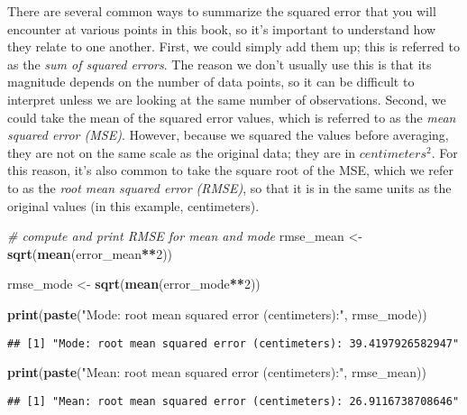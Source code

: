 \documentclass[]{book}
\newenvironment{Shaded}{\begin{snugshade}}{\end{snugshade}}
\newcommand{\KeywordTok}[1]{\textcolor[rgb]{0.13,0.29,0.53}{\textbf{#1}}}
\newcommand{\DecValTok}[1]{\textcolor[rgb]{0.00,0.00,0.81}{#1}}
\newcommand{\StringTok}[1]{\textcolor[rgb]{0.31,0.60,0.02}{#1}}
\newcommand{\CommentTok}[1]{\textcolor[rgb]{0.56,0.35,0.01}{\textit{#1}}}
\newcommand{\OperatorTok}[1]{\textcolor[rgb]{0.81,0.36,0.00}{\textbf{#1}}}
\newcommand{\NormalTok}[1]{#1}
\theoremstyle{definition}
\theoremstyle{definition}
\theoremstyle{definition}
\theoremstyle{remark}
\begin{document}
There are several common ways to summarize the squared error that you
will encounter at various points in this book, so it's important to
understand how they relate to one another. First, we could simply add
them up; this is referred to as the \emph{sum of squared errors}. The
reason we don't usually use this is that its magnitude depends on the
number of data points, so it can be difficult to interpret unless we are
looking at the same number of observations. Second, we could take the
mean of the squared error values, which is referred to as the \emph{mean
squared error (MSE)}. However, because we squared the values before
averaging, they are not on the same scale as the original data; they are
in \(centimeters^2\). For this reason, it's also common to take the
square root of the MSE, which we refer to as the \emph{root mean squared
error (RMSE)}, so that it is in the same units as the original values
(in this example, centimeters).

\begin{Shaded}
\begin{Highlighting}[]
\CommentTok{# compute and print RMSE for mean and mode}
\NormalTok{rmse_mean <-}\StringTok{ }\KeywordTok{sqrt}\NormalTok{(}\KeywordTok{mean}\NormalTok{(error_mean}\OperatorTok{**}\DecValTok{2}\NormalTok{))}

\NormalTok{rmse_mode <-}\StringTok{ }\KeywordTok{sqrt}\NormalTok{(}\KeywordTok{mean}\NormalTok{(error_mode}\OperatorTok{**}\DecValTok{2}\NormalTok{))}

\KeywordTok{print}\NormalTok{(}\KeywordTok{paste}\NormalTok{(}\StringTok{"Mode: root mean squared error (centimeters):"}\NormalTok{, rmse_mode))}
\end{Highlighting}
\end{Shaded}

\begin{verbatim}
## [1] "Mode: root mean squared error (centimeters): 39.4197926582947"
\end{verbatim}

\begin{Shaded}
\begin{Highlighting}[]
\KeywordTok{print}\NormalTok{(}\KeywordTok{paste}\NormalTok{(}\StringTok{"Mean: root mean squared error (centimeters):"}\NormalTok{, rmse_mean))}
\end{Highlighting}
\end{Shaded}

\begin{verbatim}
## [1] "Mean: root mean squared error (centimeters): 26.9116738708646"
\end{verbatim}
\end{document}
